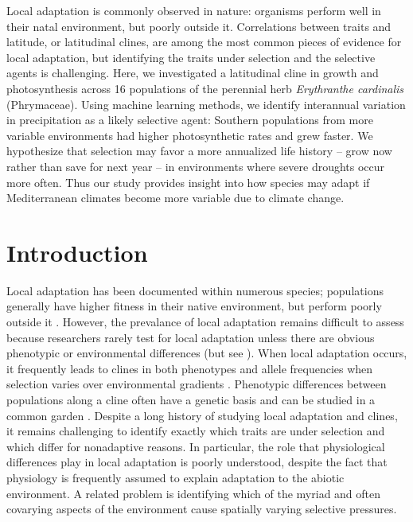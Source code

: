 \documentclass[11pt, oneside]{article}
\begin{document}
Local adaptation is commonly observed in nature: organisms perform well in their natal environment, but poorly outside it. Correlations between traits and latitude, or latitudinal clines, are among the most common pieces of evidence for local adaptation, but identifying the traits under selection and the selective agents is challenging. Here, we investigated a latitudinal cline in growth and photosynthesis across 16 populations of the perennial herb \textit{Erythranthe cardinalis} (Phrymaceae). Using machine learning methods, we identify interannual variation in precipitation as a likely selective agent: Southern populations from more variable environments had higher photosynthetic rates and grew faster. We hypothesize that selection may favor a more annualized life history -- grow now rather than save for next year -- in environments where severe droughts occur more often. Thus our study provides insight into how species may adapt if Mediterranean climates become more variable due to climate change.

\section*{Introduction}

\linenumbers

Local adaptation has been documented within numerous species; populations generally have higher fitness in their native environment, but perform poorly outside it \citep{Schluter_2000, Leimu_Fischer_2008, Hereford_2009}. However, the prevalance of local adaptation remains difficult to assess because researchers rarely test for local adaptation unless there are obvious phenotypic or environmental differences (but see \citeauthor{Hereford_Winn_2008} \citeyear{Hereford_Winn_2008}). When local adaptation occurs, it frequently leads to clines in both phenotypes and allele frequencies when selection varies over environmental gradients \citep{Huxley_1938, Endler_1977, Barton_1999}. Phenotypic differences between populations along a cline often have a genetic basis and can be studied in a common garden \citep{Turesson_1922, Clausen_etal_1940, Hiesey_etal_1942}. Despite a long history of studying local adaptation and clines, it remains challenging to identify exactly which traits are under selection and which differ for nonadaptive reasons. In particular, the role that physiological differences play in local adaptation is poorly understood, despite the fact that physiology is frequently assumed to explain adaptation to the abiotic environment. A related problem is identifying which of the myriad and often covarying aspects of the environment cause spatially varying selective pressures. 
\end{document}
